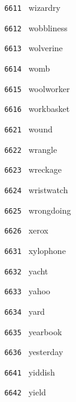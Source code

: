 \documentclass[11pt]{article}
\begin{document}
\begin{multicols}{6}
\noindent \texttt{ 6611 } \hspace{1mm} wizardry  \par
\noindent \texttt{ 6612 } \hspace{1mm} wobbliness  \par
\noindent \texttt{ 6613 } \hspace{1mm} wolverine  \par
\noindent \texttt{ 6614 } \hspace{1mm} womb  \par
\noindent \texttt{ 6615 } \hspace{1mm} woolworker  \par
\noindent \texttt{ 6616 } \hspace{1mm} workbasket  \par
\noindent \texttt{ 6621 } \hspace{1mm} wound  \par
\noindent \texttt{ 6622 } \hspace{1mm} wrangle  \par
\noindent \texttt{ 6623 } \hspace{1mm} wreckage  \par
\noindent \texttt{ 6624 } \hspace{1mm} wristwatch  \par
\noindent \texttt{ 6625 } \hspace{1mm} wrongdoing  \par
\noindent \texttt{ 6626 } \hspace{1mm} xerox  \par
\noindent \texttt{ 6631 } \hspace{1mm} xylophone  \par
\noindent \texttt{ 6632 } \hspace{1mm} yacht  \par
\noindent \texttt{ 6633 } \hspace{1mm} yahoo  \par
\noindent \texttt{ 6634 } \hspace{1mm} yard  \par
\noindent \texttt{ 6635 } \hspace{1mm} yearbook  \par
\noindent \texttt{ 6636 } \hspace{1mm} yesterday  \par
\noindent \texttt{ 6641 } \hspace{1mm} yiddish  \par
\noindent \texttt{ 6642 } \hspace{1mm} yield  \par

\end{multicols}
\end{document}
